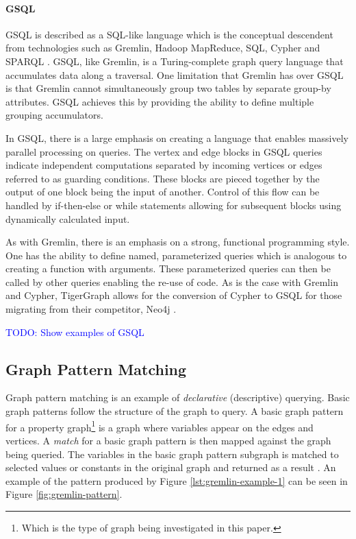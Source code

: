 \paragraph{GSQL}

GSQL is described as a SQL-like language which is the conceptual descendent from technologies such as Gremlin, Hadoop MapReduce, SQL, Cypher and SPARQL \cite{gsql-tigergraph}. GSQL, like Gremlin, is a Turing-complete graph query language that accumulates data along a traversal. One limitation that Gremlin has over GSQL is that Gremlin cannot simultaneously group two tables by separate group-by attributes. GSQL achieves this by providing the ability to define multiple grouping accumulators.

In GSQL, there is a large emphasis on creating a language that enables massively parallel processing on queries. The vertex and edge blocks in GSQL queries indicate independent computations separated by incoming vertices or edges referred to as guarding conditions. These blocks are pieced together by the output of one block being the input of another. Control of this flow can be handled by if-then-else or while statements allowing for subsequent blocks using dynamically calculated input.

As with Gremlin, there is an emphasis on a strong, functional programming style. One has the ability to define named, parameterized queries which is analogous to creating a function with arguments. These parameterized queries can then be called by other queries enabling the re-use of code. As is the case with Gremlin and Cypher, TigerGraph allows for the conversion of Cypher to GSQL for those migrating from their competitor, Neo4j \cite{tigergraph-infoworld}.

\textcolor{blue}{TODO: Show examples of GSQL}

\subsection{Graph Pattern Matching}

Graph pattern matching is an example of \emph{declarative} (descriptive) querying. Basic graph patterns follow the structure of the graph to query. A basic graph pattern for a property graph\footnote{Which is the type of graph being investigated in this paper.} is a graph where variables appear on the edges and vertices. A \emph{match} for a basic graph pattern is then mapped against the graph being queried. The variables in the basic graph pattern subgraph is matched to selected values or constants in the original graph and returned as a result \cite{foundations-of-modern-gql}. An example of the pattern produced by Figure \ref{lst:gremlin-example-1} can be seen in Figure \ref{fig:gremlin-pattern}.

